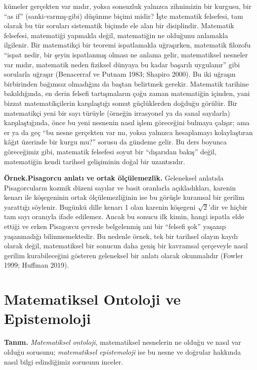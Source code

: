 kümeler gerçekten var mıdır, yoksa sonsuzluk yalnızca zihnimizin bir kurgusu, bir “as if” (sanki-varmış-gibi) düşünme biçimi midir? İşte matematik felsefesi, tam olarak bu tür soruları sistematik biçimde ele alan bir disiplindir. Matematik felsefesi, matematiği yapmakla değil, matematiğin ne olduğunu anlamakla ilgilenir. Bir matematikçi bir teoremi ispatlamakla uğraşırken, matematik filozofu “ispat nedir, bir şeyin ispatlanmış olması ne anlama gelir, matematiksel nesneler var mıdır, matematik neden fiziksel dünyaya bu kadar başarılı uygulanır” gibi sorularla uğraşır (Benacerraf ve Putnam 1983; Shapiro 2000). Bu iki uğraşın birbirinden bağımsız olmadığını da baştan belirtmek gerekir. Matematik tarihine bakıldığında, en derin felsefi tartışmaların çoğu zaman matematiğin içinden, yani bizzat matematikçilerin karşılaştığı somut güçlüklerden doğduğu görülür. Bir matematikçi yeni bir sayı türüyle (örneğin irrasyonel ya da sanal sayılarla) karşılaştığında, önce bu yeni nesnenin nasıl işlem göreceğini bulmaya çalışır; ama er ya da geç “bu nesne gerçekten var mı, yoksa yalnızca hesaplamayı kolaylaştıran kâğıt üzerinde bir kurgu mu?” sorusu da gündeme gelir. Bu ders boyunca göreceğimiz gibi, matematik felsefesi soyut bir “dışarıdan bakış” değil, matematiğin kendi tarihsel gelişiminin doğal bir uzantısıdır.

\begin{tcolorbox}[bookbox,colback=cEx]\textbf{\textsf{\textcolor{cAcc}{Örnek.}}}\quad \textbf{Pisagorcu anlatı ve ortak ölçülemezlik.} Geleneksel anlatıda Pisagorcuların kozmik düzeni sayılar ve basit oranlarla açıkladıkları, karenin kenarı ile köşegeninin ortak ölçülemezliğinin ise bu görüşle kuramsal bir gerilim yarattığı söylenir. Bugünkü dille kenarı 1 olan karenin köşegeni $\sqrt2$’dir ve hiçbir tam sayı oranıyla ifade edilemez. Ancak bu sonucu ilk kimin, hangi ispatla elde ettiği ve erken Pisagorcu çevrede belgelenmiş ani bir “felsefi şok” yaşanıp yaşanmadığı bilinmemektedir. Bu nedenle örnek, tek bir tarihsel olayın kaydı olarak değil, matematiksel bir sonucun daha geniş bir kavramsal çerçeveyle nasıl gerilim kurabileceğini gösteren geleneksel bir anlatı olarak okunmalıdır (Fowler 1999; Huffman 2019).\end{tcolorbox}

\section{Matematiksel Ontoloji ve Epistemoloji}

\begin{tcolorbox}[bookbox,colback=cDef]
\textbf{\textsf{\textcolor{cAcc}{Tanım.}}}\quad
\emph{Matematiksel ontoloji}, matematiksel nesnelerin ne olduğu ve nasıl var olduğu sorusunu; \emph{matematiksel epistemoloji} ise bu nesne ve doğrular hakkında nasıl bilgi edindiğimiz sorusunu inceler.
\end{tcolorbox}

